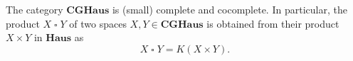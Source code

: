 The category $\mathbf{CGHaus}$ is (small) complete and cocomplete. In particular, the product $X \mathbin{\square} Y$ of two spaces $X, Y \in \mathbf{CGHaus}$ is obtained from their product $X \times Y$ in $\mathbf{Haus}$ as
$$X \mathbin{\square} Y = K(X \times Y).$$
